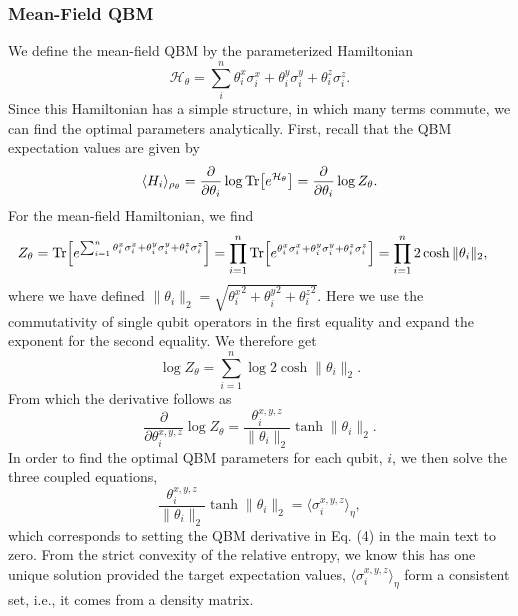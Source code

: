 \documentclass[
    reprint,
    aps,
    prx,
    longbibliography
]{revtex4-2}
\begin{document}
\subsubsection*{Mean-Field QBM}

We define the mean-field QBM by the parameterized Hamiltonian 
 \begin{equation}
    \mathcal{H}_\theta = \sum_i^n \theta^x_i \sigma_i^x + \theta^y_i \sigma_i^y +  \theta^z_i \sigma_i^z.
\end{equation} Since this Hamiltonian has a simple structure, in which many terms commute, we can find the optimal parameters analytically. First, recall that the QBM expectation values are given by \begin{equation}
    \langle H_i\rangle_{\rho_\theta} = \frac{\partial}{\partial \theta_i} \log{\Tr[e^{\mathcal{H}_\theta}]} =  \frac{\partial}{\partial \theta_i}\log{Z_\theta}. 
\end{equation} 
For the mean-field Hamiltonian, we find 
\begin{align}
    Z_\theta &= \Tr[e^{\sum_{i=1}^n\theta^x_i \sigma_i^x + \theta^y_i \sigma_i^y +  \theta^z_i \sigma_i^z}]
    =\prod_{i=1}^n \Tr[ e^{\theta^x_i \sigma_i^x + \theta^y_i \sigma_i^y + \theta^z_i \sigma_i^z}]
    = \prod_{i=1}^n 2\cosh{\|\theta_i\|_2},
\end{align} 
where we have defined $\|\theta_i\|_2=\sqrt{ {\theta_i^x}^2 + {\theta_i^y}^2 +{\theta_i^z}^2}$. Here we use the commutativity of single qubit operators in the first equality and expand the exponent for the second equality.  We therefore get \begin{equation}
\log{Z_\theta} = \sum^n_{i=1} \log{2\cosh{ \| \theta_i \|_2}}. 
\end{equation} 
From which the derivative follows as 
\begin{equation}
    \frac{\partial}{\partial \theta_i^{x,y,z}} \log{Z_\theta}
    = \frac{\theta_i^{x,y,z}}{\|\theta_i\|_2} \tanh{\|\theta_i\|_2}. 
\end{equation} 
In order to find the optimal QBM parameters for each qubit, $i$, we then solve the three coupled equations,
\begin{equation}
\label{eq:MFcoupled}
    \frac{\theta_i^{x,y,z}}{\|\theta_i\|_2} \tanh{\|\theta_i\|_2} = \langle \sigma_i^{x,y,z}\rangle_\eta,
\end{equation} 
which corresponds to setting the QBM derivative in Eq. (4) in the main text to zero. From the strict convexity of the relative entropy, we know this has one unique solution provided the target expectation values, $\langle \sigma_i^{x,y,z}\rangle_\eta$ form a consistent set, i.e., it comes from a density matrix. 
\end{document}
